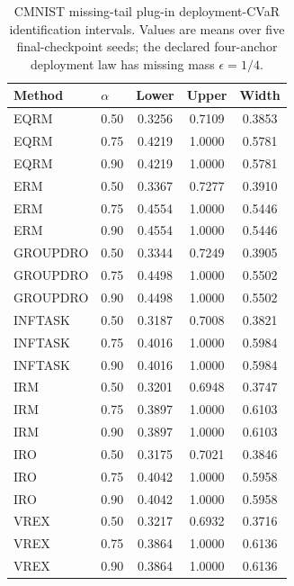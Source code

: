 \begin{table}[t]
\centering
\small
\caption{CMNIST missing-tail plug-in deployment-CVaR identification intervals. Values are means over five final-checkpoint seeds; the declared four-anchor deployment law has missing mass $\epsilon=1/4$.}
\label{tab:cmnist-missing-tail-intervals}
\begin{tabular}{llccc}
\toprule
Method & $\alpha$ & Lower & Upper & Width \\
\midrule
EQRM & 0.50 & 0.3256 & 0.7109 & 0.3853 \\
EQRM & 0.75 & 0.4219 & 1.0000 & 0.5781 \\
EQRM & 0.90 & 0.4219 & 1.0000 & 0.5781 \\
ERM & 0.50 & 0.3367 & 0.7277 & 0.3910 \\
ERM & 0.75 & 0.4554 & 1.0000 & 0.5446 \\
ERM & 0.90 & 0.4554 & 1.0000 & 0.5446 \\
GROUPDRO & 0.50 & 0.3344 & 0.7249 & 0.3905 \\
GROUPDRO & 0.75 & 0.4498 & 1.0000 & 0.5502 \\
GROUPDRO & 0.90 & 0.4498 & 1.0000 & 0.5502 \\
INFTASK & 0.50 & 0.3187 & 0.7008 & 0.3821 \\
INFTASK & 0.75 & 0.4016 & 1.0000 & 0.5984 \\
INFTASK & 0.90 & 0.4016 & 1.0000 & 0.5984 \\
IRM & 0.50 & 0.3201 & 0.6948 & 0.3747 \\
IRM & 0.75 & 0.3897 & 1.0000 & 0.6103 \\
IRM & 0.90 & 0.3897 & 1.0000 & 0.6103 \\
IRO & 0.50 & 0.3175 & 0.7021 & 0.3846 \\
IRO & 0.75 & 0.4042 & 1.0000 & 0.5958 \\
IRO & 0.90 & 0.4042 & 1.0000 & 0.5958 \\
VREX & 0.50 & 0.3217 & 0.6932 & 0.3716 \\
VREX & 0.75 & 0.3864 & 1.0000 & 0.6136 \\
VREX & 0.90 & 0.3864 & 1.0000 & 0.6136 \\
\bottomrule
\end{tabular}
\end{table}

